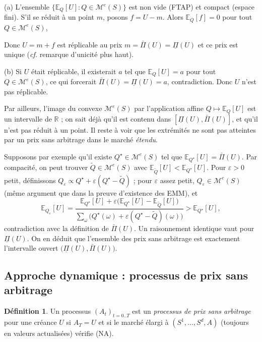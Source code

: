 \documentclass[12pt,a4paper]{article}
\makeatletter
\numberwithin{equation}{section}
\theoremstyle{plain} %
\theoremstyle{definition} %
\newtheorem{definition}{Définition}          %
\theoremstyle{remark} %
\theoremstyle{myexample}
\theoremstyle{definition}
\renewenvironment{proof}[1][\proofname]{%
  \par\vspace{0.8em}%
  \pushQED{\qed}%
  \normalfont\color{cyan}%
  \topsep6\p@\@plus6\p@\relax
  \trivlist
  \item[\hskip\labelsep\bfseries\color{cyan}#1\@addpunct{.}]\ignorespaces
}{%
  \popQED\endtrivlist\vspace{0.8em}%
}
\newcommand{\E}{\mathbb{E}}
\newcommand{\RR}{\mathbb{R}}
\makeatother
\begin{document}
\begin{proof}
(a) L’ensemble $\{\E_Q[U]:Q\in\mathcal{M}^e(S)\}$ est non vide (FTAP) et compact (espace fini).
S’il se réduit à un point $m$, posons $f=U-m$. Alors $\E_Q[f]=0$ pour tout $Q\in\mathcal{M}^e(S)$,

Donc $U=m+f$ est réplicable au prix $m=\bar\Pi(U)=\underline{\Pi}(U)$ et ce prix est unique
(\emph{cf.} remarque d’unicité plus haut).

(b) Si $U$ était réplicable, il existerait $a$ tel que $\E_Q[U]=a$ pour tout $Q\in\mathcal{M}^e(S)$,
ce qui forcerait $\bar\Pi(U)=\underline{\Pi}(U)=a$, contradiction. Donc $U$ n’est pas réplicable.

Par ailleurs, l’image du convexe $\mathcal{M}^e(S)$ par l’application affine $Q\mapsto \E_Q[U]$
est un intervalle de $\RR$ ; on sait déjà qu’il est contenu dans $[\underline{\Pi}(U),\bar\Pi(U)]$,
et qu’il n’est pas réduit à un point. Il reste à voir que les extrémités ne sont pas atteintes par un prix
sans arbitrage dans le marché \emph{étendu}.

Supposons par exemple qu’il existe $Q^\star\in\mathcal{M}^e(S)$ tel que
$\E_{Q^\star}[U]=\bar\Pi(U)$. Par compacité, on peut trouver $\tilde Q\in\mathcal{M}^e(S)$
avec $\E_{\tilde Q}[U]<\E_{Q^\star}[U]$. Pour $\varepsilon>0$ petit, définissons
$Q_\varepsilon \propto Q^\star+\varepsilon(Q^\star-\tilde Q)$ ; pour $\varepsilon$ assez petit,
$Q_\varepsilon\in\mathcal{M}^e(S)$ (même argument que dans la preuve d’existence des EMM),
et
\[
\E_{Q_\varepsilon}[U]
=\frac{\E_{Q^\star}[U]+\varepsilon\big(\E_{Q^\star}[U]-\E_{\tilde Q}[U]\big)}
      {\sum_\omega \big(Q^\star(\omega)+\varepsilon(Q^\star-\tilde Q)(\omega)\big)}
>\E_{Q^\star}[U],
\]
contradiction avec la définition de $\bar\Pi(U)$. Un raisonnement identique vaut pour $\underline{\Pi}(U)$.
On en déduit que l’ensemble des prix sans arbitrage est exactement l’intervalle ouvert
$\big(\underline{\Pi}(U),\bar\Pi(U)\big)$.
\end{proof}

\subsection{Approche dynamique : processus de prix sans arbitrage}

\begin{definition}\label{def:processus_prix_NA}
Un processus $(A_t)_{t=0..T}$ est un \emph{processus de prix sans arbitrage} pour une créance $U$
si $A_T=U$ et si le marché élargi à $(S^1,\dots,S^d,A)$ (toujours en valeurs actualisées)
vérifie (NA).
\end{definition}
\end{document}
